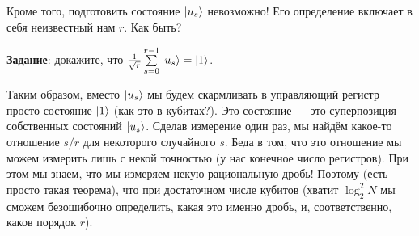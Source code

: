 \documentclass[12pt]{article}
\begin{document}
Кроме того, подготовить состояние $\Ket{u_s}$ невозможно! Его определение включает в себя неизвестный нам $r$. Как быть? 

{\bf Задание}: докажите, что $\frac{1}{\sqrt{r}}\sum\limits_{s = 0}^{r - 1}\Ket{u_s} = \Ket{1}$.

Таким образом, вместо $\Ket{u_s}$ мы будем скармливать в управляющий регистр просто состояние $\Ket{1}$ (как это в кубитах?). Это состояние --- это суперпозиция собственных состояний $\Ket{u_s}$. Сделав измерение один раз, мы найдём какое-то отношение $s / r$ для некоторого случайного $s$. Беда в том, что это отношение мы можем измерить лишь с некой точностью (у нас конечное число регистров). При этом мы знаем, что мы измеряем некую рациональную дробь! Поэтому (есть просто такая теорема), что при достаточном числе кубитов (хватит $\log_2^2 N$ мы сможем безошибочно определить, какая это именно дробь, и, соответственно, каков порядок $r$).
\end{document}
